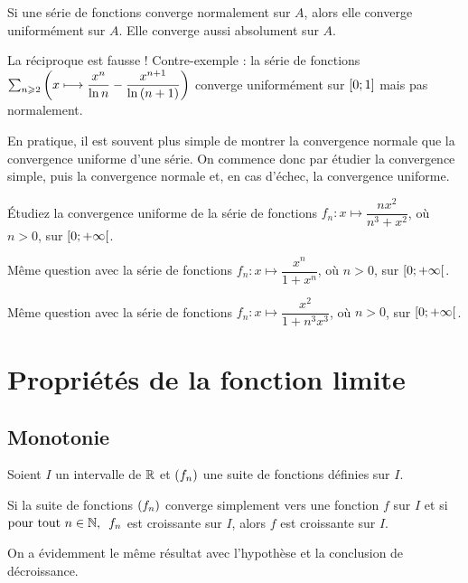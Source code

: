 \begin{theo}
Si une série de fonctions converge normalement sur \(A\), alors elle converge uniformément sur \(A\). Elle converge aussi absolument sur \(A\).
\end{theo}

La réciproque est fausse ! Contre-exemple : la série de fonctions \(\sum_{n\geqslant2}\left(x\longmapsto\dfrac{x^n}{\ln n}-\dfrac{x^{n+1}}{\ln\left(n+1\right)}\right)\) converge uniformément sur \(\left[0;1\right]\) mais pas normalement.

En pratique, il est souvent plus simple de montrer la convergence normale que la convergence uniforme d'une série. On commence donc par étudier la convergence simple, puis la convergence normale et, en cas d'échec, la convergence uniforme.

\begin{exo}
Étudiez la convergence uniforme de la série de fonctions \(f_n:x\mapsto\dfrac{nx^2}{n^3+x^2}\), où \(n>0\), sur \(\left[0;+\infty\right[\).
\end{exo}

\begin{exo}
Même question avec la série de fonctions \(f_n:x\mapsto\dfrac{x^n}{1+x^n}\), où \(n>0\), sur \(\left[0;+\infty\right[\).
\end{exo}

\begin{exo}
Même question avec la série de fonctions \(f_n:x\mapsto\dfrac{x^2}{1+n^3x^3}\), où \(n>0\), sur \(\left[0;+\infty\right[\).
\end{exo}

\section{Propriétés de la fonction limite}

\subsection{Monotonie}

\begin{prop}
Soient \(I\) un intervalle de \(\mathbb{R}\) et \(\left(f_n\right)\) une suite de fonctions définies sur \(I\).

Si la suite de fonctions \(\left(f_n\right)\) converge simplement vers une fonction \(f\) sur \(I\) et si \(\quantifs{\tpt n\in\N}f_n\) est croissante sur \(I\), alors \(f\) est croissante sur \(I\).
\end{prop}

On a évidemment le même résultat avec l'hypothèse et la conclusion de décroissance.

